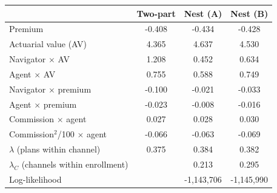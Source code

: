\begin{tabular}{lccc}
\hline\hline
 & Two-part & Nest (A) & Nest (B) \\
\hline
Premium & -0.408 & -0.434 & -0.428 \\
Actuarial value (AV) & 4.365 & 4.637 & 4.530 \\
Navigator $\times$ AV & 1.208 & 0.452 & 0.634 \\
Agent $\times$ AV & 0.755 & 0.588 & 0.749 \\
Navigator $\times$ premium & -0.100 & -0.021 & -0.033 \\
Agent $\times$ premium & -0.023 & -0.008 & -0.016 \\
Commission $\times$ agent & 0.027 & 0.028 & 0.030 \\
Commission$^2$/100 $\times$ agent & -0.066 & -0.063 & -0.069 \\
$\lambda$ (plans within channel) & 0.375 & 0.384 & 0.382 \\
$\lambda_C$ (channels within enrollment) &  & 0.213 & 0.295 \\
Log-likelihood & & -1,143,706 & -1,145,990 \\
\hline\hline
\end{tabular}
